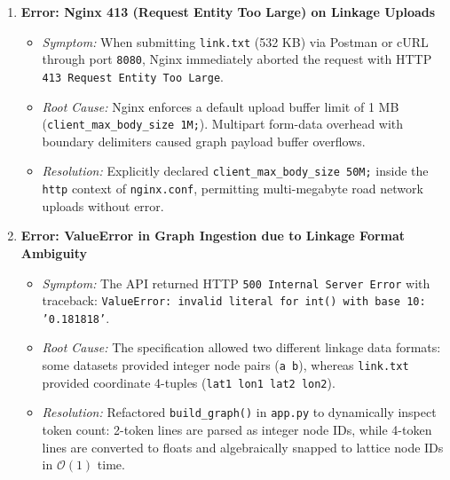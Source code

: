 \documentclass[11pt,a4paper]{article}
\begin{document}
\begin{enumerate}
    \item \textbf{Error: Nginx 413 (Request Entity Too Large) on Linkage Uploads}
    \begin{itemize}
        \item \emph{Symptom:} When submitting \texttt{link.txt} (532 KB) via Postman or cURL through port \texttt{8080}, Nginx immediately aborted the request with HTTP \texttt{413 Request Entity Too Large}.
        \item \emph{Root Cause:} Nginx enforces a default upload buffer limit of 1 MB (\texttt{client\_max\_body\_size 1M;}). Multipart form-data overhead with boundary delimiters caused graph payload buffer overflows.
        \item \emph{Resolution:} Explicitly declared \texttt{client\_max\_body\_size 50M;} inside the \texttt{http} context of \texttt{nginx.conf}, permitting multi-megabyte road network uploads without error.
    \end{itemize}

    \item \textbf{Error: ValueError in Graph Ingestion due to Linkage Format Ambiguity}
    \begin{itemize}
        \item \emph{Symptom:} The API returned HTTP \texttt{500 Internal Server Error} with traceback: \newline \texttt{ValueError: invalid literal for int() with base 10: '0.181818'}.
        \item \emph{Root Cause:} The specification allowed two different linkage data formats: some datasets provided integer node pairs (\texttt{a b}), whereas \texttt{link.txt} provided coordinate 4-tuples (\texttt{lat1 lon1 lat2 lon2}).
        \item \emph{Resolution:} Refactored \texttt{build\_graph()} in \texttt{app.py} to dynamically inspect token count: 2-token lines are parsed as integer node IDs, while 4-token lines are converted to floats and algebraically snapped to lattice node IDs in $\mathcal{O}(1)$ time.
    \end{itemize}


\end{enumerate}
\end{document}
